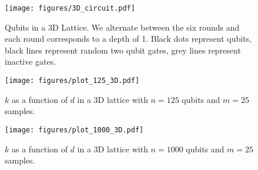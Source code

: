 \message{ !name(report_1.tex)}\documentclass[11pt]{article}
\theoremstyle{definition}
\theoremstyle{plain}
\begin{document}
\begin{figure}[!htp]
\centering
\texttt{[image: figures/3D\_circuit.pdf]}
\caption{Qubits in a 3D Lattice. We alternate between the six rounds and each round corresponds to a depth of 1. Black dots represent qubits, black lines represent random two qubit gates, grey lines represent inactive gates. }
\label{fig_3d}
\end{figure}

\begin{figure}[!htp]
\centering
\texttt{[image: figures/plot\_125\_3D.pdf]}
\caption{$k$ as a function of $d$ in a 3D lattice with $n = 125$ qubits and $m = 25$ samples.}
\label{plot_3d_1}
\end{figure}

\begin{figure}[!htp]
\centering
\texttt{[image: figures/plot\_1000\_3D.pdf]}
\caption{$k$ as a function of $d$ in a 3D lattice with $n = 1000$ qubits and $m =25$ samples.}
\label{plot_3d_2} 
\end{figure} 

\clearpage 


\end{document}
